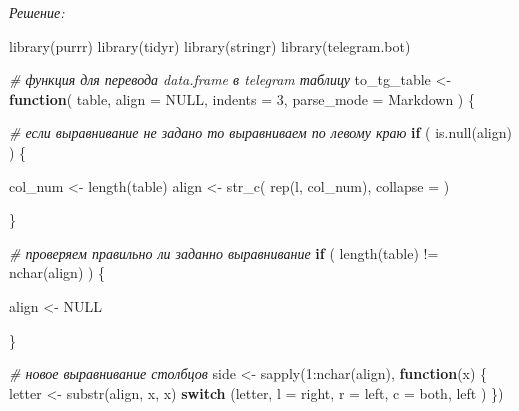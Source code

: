 \documentclass[
]{book}
\newenvironment{Shaded}{\begin{snugshade}}{\end{snugshade}}
\newcommand{\AttributeTok}[1]{\textcolor[rgb]{0.77,0.63,0.00}{#1}}
\newcommand{\CommentTok}[1]{\textcolor[rgb]{0.56,0.35,0.01}{\textit{#1}}}
\newcommand{\ConstantTok}[1]{\textcolor[rgb]{0.00,0.00,0.00}{#1}}
\newcommand{\ControlFlowTok}[1]{\textcolor[rgb]{0.13,0.29,0.53}{\textbf{#1}}}
\newcommand{\DecValTok}[1]{\textcolor[rgb]{0.00,0.00,0.81}{#1}}
\newcommand{\FunctionTok}[1]{\textcolor[rgb]{0.00,0.00,0.00}{#1}}
\newcommand{\NormalTok}[1]{#1}
\newcommand{\OtherTok}[1]{\textcolor[rgb]{0.56,0.35,0.01}{#1}}
\newcommand{\SpecialCharTok}[1]{\textcolor[rgb]{0.00,0.00,0.00}{#1}}
\newcommand{\StringTok}[1]{\textcolor[rgb]{0.31,0.60,0.02}{#1}}
\begin{document}
\emph{Решение:}

\begin{Shaded}
\begin{Highlighting}[]
\FunctionTok{library}\NormalTok{(purrr)}
\FunctionTok{library}\NormalTok{(tidyr)}
\FunctionTok{library}\NormalTok{(stringr)}
\FunctionTok{library}\NormalTok{(telegram.bot)}

\CommentTok{\# функция для перевода data.frame в telegram таблицу }
\NormalTok{to\_tg\_table }\OtherTok{\textless{}{-}} \ControlFlowTok{function}\NormalTok{( table, }\AttributeTok{align =} \ConstantTok{NULL}\NormalTok{, }\AttributeTok{indents =} \DecValTok{3}\NormalTok{, }\AttributeTok{parse\_mode =} \StringTok{\textquotesingle{}Markdown\textquotesingle{}}\NormalTok{ ) \{}
  
  \CommentTok{\# если выравнивание не задано то выравниваем по левому краю}
  \ControlFlowTok{if}\NormalTok{ ( }\FunctionTok{is.null}\NormalTok{(align) ) \{}
    
\NormalTok{    col\_num }\OtherTok{\textless{}{-}} \FunctionTok{length}\NormalTok{(table)}
\NormalTok{    align   }\OtherTok{\textless{}{-}} \FunctionTok{str\_c}\NormalTok{( }\FunctionTok{rep}\NormalTok{(}\StringTok{\textquotesingle{}l\textquotesingle{}}\NormalTok{, col\_num), }\AttributeTok{collapse =} \StringTok{\textquotesingle{}\textquotesingle{}}\NormalTok{ )}
    
\NormalTok{  \}}
  
  \CommentTok{\# проверяем правильно ли заданно выравнивание}
  \ControlFlowTok{if}\NormalTok{ ( }\FunctionTok{length}\NormalTok{(table) }\SpecialCharTok{!=} \FunctionTok{nchar}\NormalTok{(align) ) \{}
    
\NormalTok{    align }\OtherTok{\textless{}{-}} \ConstantTok{NULL}
    
\NormalTok{  \}}
  
  \CommentTok{\# новое выравнивание столбцов }
\NormalTok{  side }\OtherTok{\textless{}{-}} \FunctionTok{sapply}\NormalTok{(}\DecValTok{1}\SpecialCharTok{:}\FunctionTok{nchar}\NormalTok{(align), }
                 \ControlFlowTok{function}\NormalTok{(x) \{ }
\NormalTok{                   letter }\OtherTok{\textless{}{-}} \FunctionTok{substr}\NormalTok{(align, x, x)}
                   \ControlFlowTok{switch}\NormalTok{ (letter,}
                           \StringTok{\textquotesingle{}l\textquotesingle{}} \OtherTok{=} \StringTok{\textquotesingle{}right\textquotesingle{}}\NormalTok{,}
                           \StringTok{\textquotesingle{}r\textquotesingle{}} \OtherTok{=} \StringTok{\textquotesingle{}left\textquotesingle{}}\NormalTok{,}
                           \StringTok{\textquotesingle{}c\textquotesingle{}} \OtherTok{=} \StringTok{\textquotesingle{}both\textquotesingle{}}\NormalTok{,}
                           \StringTok{\textquotesingle{}left\textquotesingle{}}
\NormalTok{                   )}
\NormalTok{                 \})}
  

\end{Highlighting}
\end{Shaded}
\end{document}

